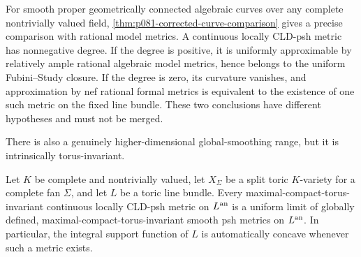 For smooth proper geometrically connected algebraic curves over any
complete nontrivially valued field,
\cref{thm:p081-corrected-curve-comparison} gives a precise comparison with
rational model metrics.  A continuous locally CLD-psh metric has
nonnegative degree.  If the degree is positive, it is uniformly
approximable by relatively ample rational algebraic model metrics, hence
belongs to the uniform Fubini--Study closure.  If the degree is zero, its
curvature vanishes, and approximation by nef rational formal metrics is
equivalent to the existence of one such metric on the fixed line bundle.
These two conclusions have different hypotheses and must not be merged.

There is also a genuinely higher-dimensional global-smoothing range, but it
is intrinsically torus-invariant.
\begin{proposition}
\label{prop:p081-invariant-projective-toric-global-smoothing}
Let \(K\) be complete and nontrivially valued, let \(X_\Sigma\) be a
split toric \(K\)-variety for a complete fan \(\Sigma\), and let \(L\) be a
toric line bundle.  Every maximal-compact-torus-invariant continuous locally
CLD-psh metric on \(L^{\mathrm{an}}\) is a uniform limit of globally defined,
maximal-compact-torus-invariant smooth psh metrics on \(L^{\mathrm{an}}\).  In
particular, the integral support function of \(L\) is automatically concave
whenever such a metric exists.
\end{proposition}

